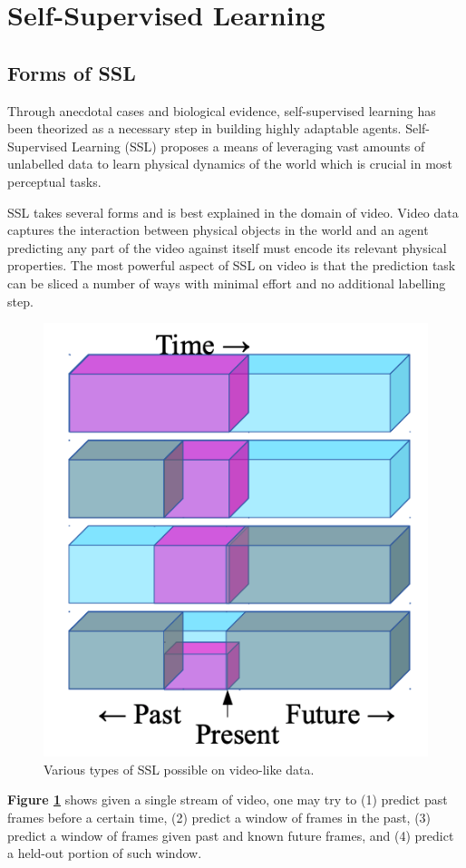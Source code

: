 \section{Self-Supervised Learning}

\subsection{Forms of SSL}

Through anecdotal cases and biological evidence, self-supervised learning has been theorized as a necessary step in building highly adaptable agents. 
Self-Supervised Learning (SSL) proposes a means of leveraging vast amounts of unlabelled data to learn physical dynamics of the world which is crucial in most perceptual tasks. 

SSL takes several forms and is best explained in the domain of video. Video data captures the interaction between physical objects in the world and an agent predicting any part of the video against itself must encode its relevant physical properties. The most powerful aspect of SSL on video is that the prediction task can be sliced a number of ways with minimal effort and no additional labelling step.

\begin{figure}
\includegraphics[width=0.5\linewidth]{lectures/12-b/ssl_types.png}
\centering
\caption{Various types of SSL possible on video-like data.}
\label{fig:ssl_types}
\end{figure}

\textbf{Figure \ref{fig:ssl_types}} shows given a single stream of video, one may try to (1) predict past frames before a certain time, (2) predict a window of frames in the past, (3) predict a window of frames given past and known future frames, and (4) predict a held-out portion of such window. 

